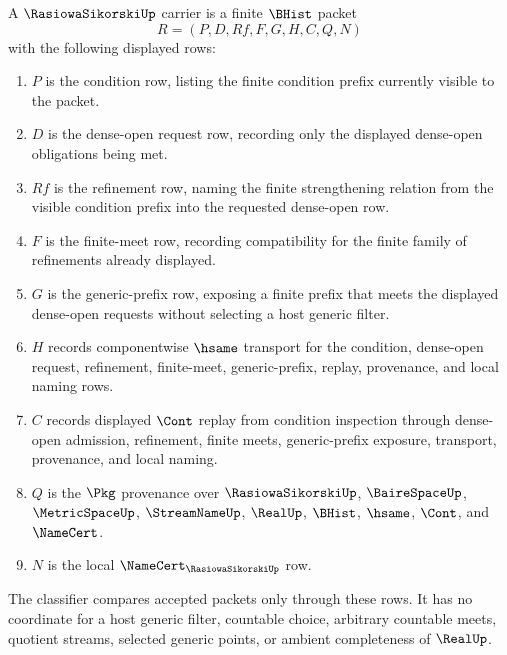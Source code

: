 \begin{definition}
\label{def:rasiowa-sikorski-carrier}
A $\RasiowaSikorskiUp$ carrier is a finite $\BHist$ packet
$$
R=(P,D,Rf,F,G,H,C,Q,N)
$$
with the following displayed rows:
\begin{enumerate}
\item $P$ is the condition row, listing the finite condition prefix currently visible to the packet.
\item $D$ is the dense-open request row, recording only the displayed dense-open obligations being met.
\item $Rf$ is the refinement row, naming the finite strengthening relation from the visible condition prefix into the requested dense-open row.
\item $F$ is the finite-meet row, recording compatibility for the finite family of refinements already displayed.
\item $G$ is the generic-prefix row, exposing a finite prefix that meets the displayed dense-open requests without selecting a host generic filter.
\item $H$ records componentwise $\hsame$ transport for the condition, dense-open request, refinement, finite-meet, generic-prefix, replay, provenance, and local naming rows.
\item $C$ records displayed $\Cont$ replay from condition inspection through dense-open admission, refinement, finite meets, generic-prefix exposure, transport, provenance, and local naming.
\item $Q$ is the $\Pkg$ provenance over $\RasiowaSikorskiUp$, $\BaireSpaceUp$, $\MetricSpaceUp$, $\StreamNameUp$, $\RealUp$, $\BHist$, $\hsame$, $\Cont$, and $\NameCert$.
\item $N$ is the local $\NameCert_{\RasiowaSikorskiUp}$ row.
\end{enumerate}
The classifier compares accepted packets only through these rows. It has no coordinate for a host generic filter, countable choice, arbitrary countable meets, quotient streams, selected generic points, or ambient completeness of $\RealUp$.
\end{definition}

